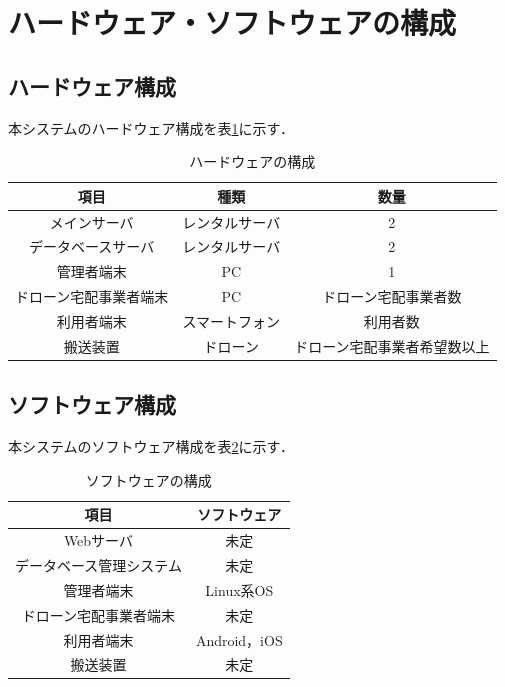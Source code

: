 \documentclass[a4paper, titlepage]{jsarticle}
\begin{document}
\section{ハードウェア・ソフトウェアの構成}
\subsection{ハードウェア構成}
本システムのハードウェア構成を表\ref{fig:hardware}に示す．
\begin{table}[H]
 \begin{center}
  \caption{ハードウェアの構成}
    \label{fig:hardware}
  \begin{tabular}{ccc} \hline
    項目 & 種類 & 数量 \\ \hline \hline
    メインサーバ & レンタルサーバ & 2 \\
    データベースサーバ & レンタルサーバ & 2 \\
    管理者端末 & PC & 1 \\
    ドローン宅配事業者端末 & PC & ドローン宅配事業者数 \\
    利用者端末 & スマートフォン & 利用者数 \\
    搬送装置 & ドローン & ドローン宅配事業者希望数以上 \\ \hline
  \end{tabular}
 \end{center}
\end{table}
\subsection{ソフトウェア構成}
本システムのソフトウェア構成を表\ref{fig:software}に示す．
\begin{table}[H]
 \begin{center}
  \caption{ソフトウェアの構成}
    \label{fig:software}
  \begin{tabular}{cc} \hline
    項目 & ソフトウェア \\ \hline \hline
    Webサーバ & 未定 \\
    データベース管理システム & 未定 \\
    管理者端末 & Linux系OS \\
    ドローン宅配事業者端末 & 未定 \\
    利用者端末 & Android，iOS \\
    搬送装置 & 未定 \\ \hline
  \end{tabular}
 \end{center}
\end{table}
\end{document}
